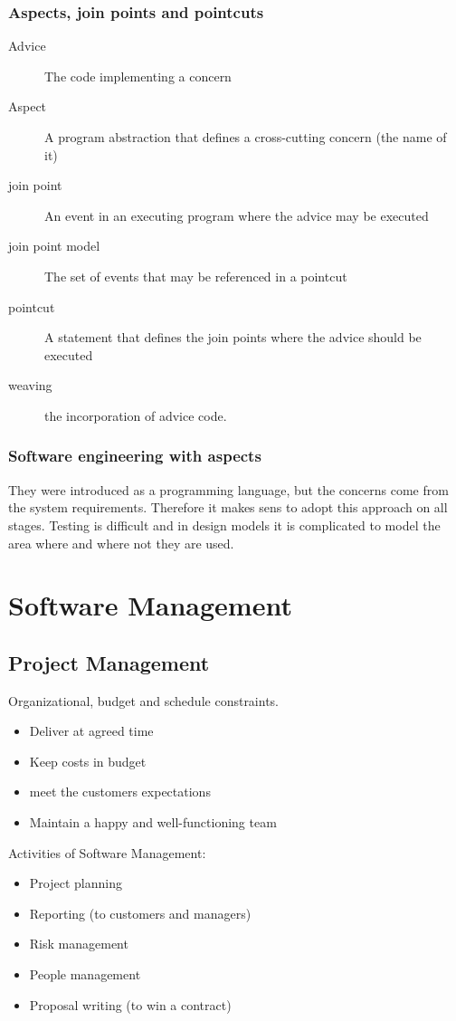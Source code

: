 \documentclass[a4paper,11pt,twocolumn]{report}
\begin{document}
    \section{Aspects, join points and pointcuts}
    \begin{description}
        \item[Advice] The code implementing a concern
        \item[Aspect] A program abstraction that defines a cross-cutting
            concern (the name of it)
        \item[join point] An event in an executing program where the advice may
            be executed
        \item[join point model] The set of events that may be referenced in a
            pointcut
        \item[pointcut] A statement that defines the join points where the
            advice should be executed
        \item[weaving] the incorporation of advice code.
    \end{description}
    \section{Software engineering with aspects}
    They were introduced as a programming language, but the concerns come from
    the system requirements. Therefore it makes sens to adopt this approach on
    all stages. Testing is difficult and in design models it is complicated to
    model the area where and where not they are used.


    \part{Software Management}
    \chapter{Project Management}
    Organizational, budget and schedule constraints.
    \begin{itemize}
        \item Deliver at agreed time
        \item Keep costs in budget
        \item meet the customers expectations
        \item Maintain a happy and well-functioning team
    \end{itemize}
    Activities of Software Management:
    \begin{itemize}
        \item Project planning
        \item Reporting (to customers and managers)
        \item Risk management
        \item People management
        \item Proposal writing (to win a contract)
    \end{itemize}
\end{document}
